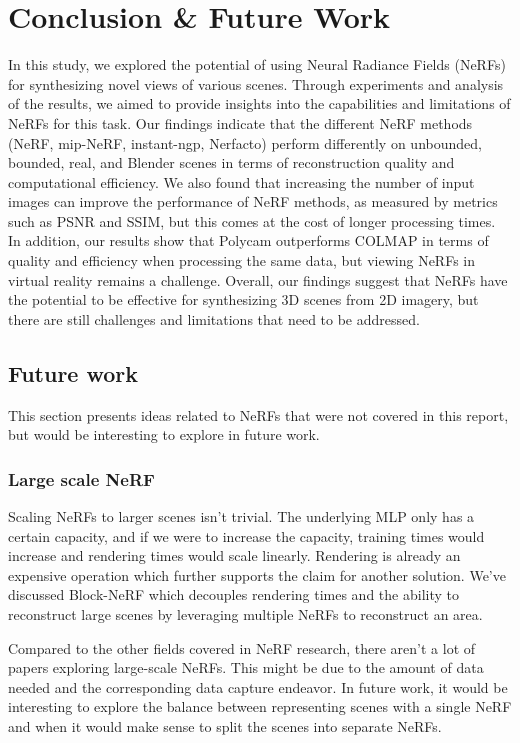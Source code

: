\chapter{Conclusion \& Future Work}
In this study, we explored the potential of using Neural Radiance Fields (NeRFs) for synthesizing novel views of various scenes. Through experiments and analysis of the results, we aimed to provide insights into the capabilities and limitations of NeRFs for this task. Our findings indicate that the different NeRF methods (NeRF, mip-NeRF, instant-ngp, Nerfacto) perform differently on unbounded, bounded, real, and Blender scenes in terms of reconstruction quality and computational efficiency. We also found that increasing the number of input images can improve the performance of NeRF methods, as measured by metrics such as PSNR and SSIM, but this comes at the cost of longer processing times. In addition, our results show that Polycam outperforms COLMAP in terms of quality and efficiency when processing the same data, but viewing NeRFs in virtual reality remains a challenge. Overall, our findings suggest that NeRFs have the potential to be effective for synthesizing 3D scenes from 2D imagery, but there are still challenges and limitations that need to be addressed.

\section{Future work}
This section presents ideas related to NeRFs that were not covered in this report, but would be interesting to explore in future work.

\subsection{Large scale NeRF}
Scaling NeRFs to larger scenes isn't trivial. The underlying MLP only has a certain capacity, and if we were to increase the capacity, training times would increase and rendering times would scale linearly. Rendering is already an expensive operation which further supports the claim for another solution. We've discussed Block-NeRF which decouples rendering times and the ability to reconstruct large scenes by leveraging multiple NeRFs to reconstruct an area.

Compared to the other fields covered in NeRF research, there aren't a lot of papers exploring large-scale NeRFs. This might be due to the amount of data needed and the corresponding data capture endeavor. In future work, it would be interesting to explore the balance between representing scenes with a single NeRF and when it would make sense to split the scenes into separate NeRFs.

